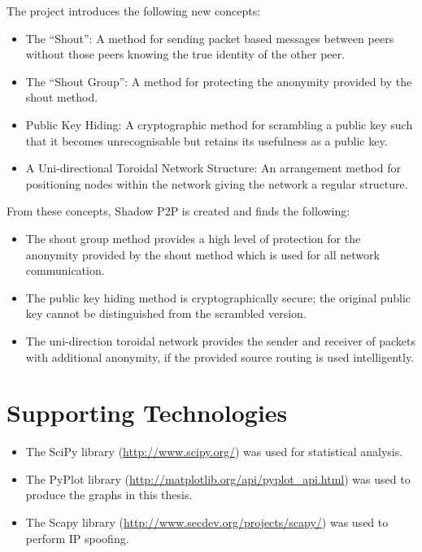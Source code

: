 \documentclass[ %
                    author={Luke Murray},
                supervisor={Dr. Simon Hollis},
                     title={Shadow Peer-to-Peer Networks},
                  subtitle={},
                    degree={MEng},
                      year={2013} ]{thesis}
\begin{document}
The project introduces the following new concepts:
\begin{itemize}
\item The ``Shout'': A method for sending packet based messages between peers without those peers knowing the true identity of the other peer.
\item The ``Shout Group'': A method for protecting the anonymity provided by the shout method.
\item Public Key Hiding: A cryptographic method for scrambling a public key such that it becomes unrecognisable but retains its usefulness as a public key.
\item A Uni-directional Toroidal Network Structure: An arrangement method for positioning nodes within the network giving the network a regular structure.
\end{itemize}

From these concepts, Shadow P2P is created and finds the following:
\begin{itemize}
\item The shout group method provides a high level of protection for the anonymity provided by the shout method which is used for all network communication.
\item The public key hiding method is cryptographically secure; the original public key cannot be distinguished from the scrambled version.
\item The uni-direction toroidal network provides the sender and receiver of packets with additional anonymity, if the provided source routing is used intelligently.
\end{itemize}

\listoffigures
\listoftables
\listofalgorithms

\tableofcontents


\chapter*{Supporting Technologies}

\begin{itemize}
\item The SciPy library (\url{http://www.scipy.org/}) was used for statistical analysis.
\item The PyPlot library (\url{http://matplotlib.org/api/pyplot_api.html}) was used to produce the graphs in this thesis.
\item The Scapy library (\url{http://www.secdev.org/projects/scapy/}) was used to perform IP spoofing.
\end{itemize}
\end{document}
